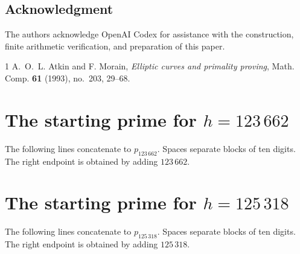 \documentclass[11pt]{amsart}
\begin{document}
\subsection*{Acknowledgment}
The authors acknowledge OpenAI Codex for assistance with the construction,
finite arithmetic verification, and preparation of this paper.
\begin{thebibliography}{1}
A.~O.~L. Atkin and F. Morain,
\emph{Elliptic curves and primality proving},
Math. Comp. \textbf{61} (1993), no.~203, 29--68.
\end{thebibliography}

\appendix
\clearpage
\section{The starting prime for $h=123\,662$}\label{app:first}
The following lines concatenate to $p_{123\,662}$. Spaces separate blocks
of ten digits. The right endpoint is obtained by adding $123\,662$.

\clearpage
\section{The starting prime for $h=125\,318$}\label{app:second}
The following lines concatenate to $p_{125\,318}$. Spaces separate blocks
of ten digits. The right endpoint is obtained by adding $125\,318$.

\end{document}
